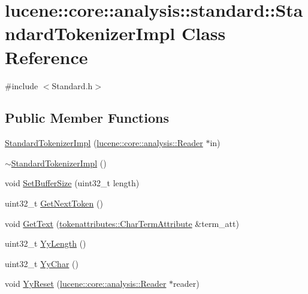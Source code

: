 \hypertarget{classlucene_1_1core_1_1analysis_1_1standard_1_1StandardTokenizerImpl}{}\section{lucene\+:\+:core\+:\+:analysis\+:\+:standard\+:\+:Standard\+Tokenizer\+Impl Class Reference}
\label{classlucene_1_1core_1_1analysis_1_1standard_1_1StandardTokenizerImpl}


{\ttfamily \#include $<$Standard.\+h$>$}

\subsection*{Public Member Functions}
\begin{DoxyCompactItemize}
\item 
\mbox{\hyperlink{classlucene_1_1core_1_1analysis_1_1standard_1_1StandardTokenizerImpl_a64aeb3d3c5c64b3c099a9042930d2072}{Standard\+Tokenizer\+Impl}} (\mbox{\hyperlink{classlucene_1_1core_1_1analysis_1_1Reader}{lucene\+::core\+::analysis\+::\+Reader}} $\ast$in)
\item 
\mbox{\hyperlink{classlucene_1_1core_1_1analysis_1_1standard_1_1StandardTokenizerImpl_a7b85d18cb75dd13793a2c067aa41eb0a}{$\sim$\+Standard\+Tokenizer\+Impl}} ()
\item 
void \mbox{\hyperlink{classlucene_1_1core_1_1analysis_1_1standard_1_1StandardTokenizerImpl_afc6d8904d6816baa27c54471da7f8755}{Set\+Buffer\+Size}} (uint32\+\_\+t length)
\item 
uint32\+\_\+t \mbox{\hyperlink{classlucene_1_1core_1_1analysis_1_1standard_1_1StandardTokenizerImpl_a4198bd2f50a136429db69c6f4025b571}{Get\+Next\+Token}} ()
\item 
void \mbox{\hyperlink{classlucene_1_1core_1_1analysis_1_1standard_1_1StandardTokenizerImpl_a8e389a9a4f8659fcdaead22795c132f3}{Get\+Text}} (\mbox{\hyperlink{classlucene_1_1core_1_1analysis_1_1tokenattributes_1_1CharTermAttribute}{tokenattributes\+::\+Char\+Term\+Attribute}} \&term\+\_\+att)
\item 
uint32\+\_\+t \mbox{\hyperlink{classlucene_1_1core_1_1analysis_1_1standard_1_1StandardTokenizerImpl_a8305da33749783d1e360abea1d384adb}{Yy\+Length}} ()
\item 
uint32\+\_\+t \mbox{\hyperlink{classlucene_1_1core_1_1analysis_1_1standard_1_1StandardTokenizerImpl_a1dec98b86d7ce0b2dd6a674380599f6c}{Yy\+Char}} ()
\item 
void \mbox{\hyperlink{classlucene_1_1core_1_1analysis_1_1standard_1_1StandardTokenizerImpl_accacb4bb2516823080aaaf0d09855958}{Yy\+Reset}} (\mbox{\hyperlink{classlucene_1_1core_1_1analysis_1_1Reader}{lucene\+::core\+::analysis\+::\+Reader}} $\ast$reader)
\end{DoxyCompactItemize}
